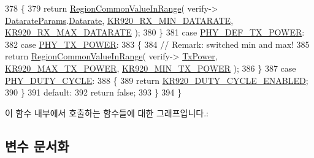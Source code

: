 \begin{DoxyCode}
378         \{
379             \textcolor{keywordflow}{return} \mbox{\hyperlink{group___r_e_g_i_o_n_c_o_m_m_o_n_gafdd1c80d953e18d755a631b72a9c3bd3}{RegionCommonValueInRange}}( verify->
      \mbox{\hyperlink{unionu_verify_params_a92427be16343eb3d9c14334eb95ec058}{DatarateParams}}.\mbox{\hyperlink{structu_verify_params_1_1s_datarate_params_ae2f6080f3aa0e9485c55513ca56bb24d}{Datarate}}, \mbox{\hyperlink{group___r_e_g_i_o_n_k_r920_ga07e6cd760fe7f1fc3a572fdf20ceebb6}{KR920\_RX\_MIN\_DATARATE}}, 
      \mbox{\hyperlink{group___r_e_g_i_o_n_k_r920_gae396329e09e498a769761010503fb797}{KR920\_RX\_MAX\_DATARATE}} );
380         \}
381         \textcolor{keywordflow}{case} \mbox{\hyperlink{group___r_e_g_i_o_n_gga51cbe8f5433d914fe9cf81b451de2c2da18ae0d314f20c212f9e40207099ab1bb}{PHY\_DEF\_TX\_POWER}}:
382         \textcolor{keywordflow}{case} \mbox{\hyperlink{group___r_e_g_i_o_n_gga51cbe8f5433d914fe9cf81b451de2c2da0dceb30b79f1bae301afd5406a86d6f3}{PHY\_TX\_POWER}}:
383         \{
384             \textcolor{comment}{// Remark: switched min and max!}
385             \textcolor{keywordflow}{return} \mbox{\hyperlink{group___r_e_g_i_o_n_c_o_m_m_o_n_gafdd1c80d953e18d755a631b72a9c3bd3}{RegionCommonValueInRange}}( verify->
      \mbox{\hyperlink{unionu_verify_params_a037b4f849fa8ed4aa1d3c58aef2b28ec}{TxPower}}, \mbox{\hyperlink{group___r_e_g_i_o_n_k_r920_ga83f7aad24311983622b179a74c3c80d0}{KR920\_MAX\_TX\_POWER}}, \mbox{\hyperlink{group___r_e_g_i_o_n_k_r920_gab7d15217c552fe7d9acbef2e18d773a4}{KR920\_MIN\_TX\_POWER}} );
386         \}
387         \textcolor{keywordflow}{case} \mbox{\hyperlink{group___r_e_g_i_o_n_gga51cbe8f5433d914fe9cf81b451de2c2dac66308571e624ecc28c79ee0deab8cf0}{PHY\_DUTY\_CYCLE}}:
388         \{
389             \textcolor{keywordflow}{return} \mbox{\hyperlink{group___r_e_g_i_o_n_k_r920_ga397c5cdfee65398f7e9c7a47180cc0b2}{KR920\_DUTY\_CYCLE\_ENABLED}};
390         \}
391         \textcolor{keywordflow}{default}:
392             \textcolor{keywordflow}{return} \textcolor{keyword}{false};
393     \}
394 \}
\end{DoxyCode}
이 함수 내부에서 호출하는 함수들에 대한 그래프입니다.\+:


\subsection{변수 문서화}
\mbox{\label{group___r_e_g_i_o_n_k_r920_ga8f1abef3b467ea68edb452c7adcc8e08}} 
